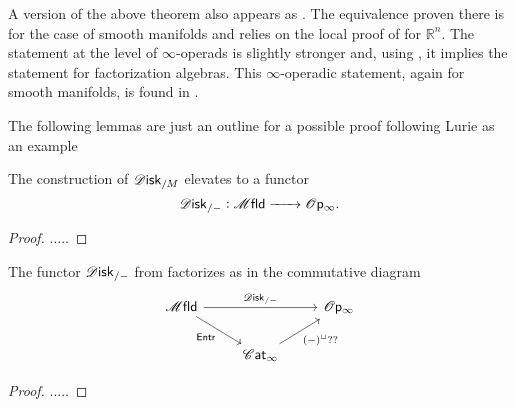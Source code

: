 \documentclass[../text.tex]{subfiles}
\begin{document}
\begin{remark}
    A version of the above theorem also appears as \cite[prop.18]{ginot2015}. The equivalence proven there is for the case of smooth manifolds and relies on the local proof of \cite{lurie_ha} for $\mathbb{R}^n$. The statement at the level of $\infty$-operads is slightly stronger and, using , it implies the statement for factorization algebras. This $\infty$-operadic statement, again for smooth manifolds, is found in \cite[ex.5.4.5.5]{lurie_ha}.
\end{remark}

{\color{red} The following lemmas are just an outline for a possible proof following Lurie as an example}

\begin{lemma}\label{lem:slicing_disk_functor}
    The construction of $\disk_{/M}$ elevates to a functor
    \begin{equation}
        \disk_{/-}: \mfld \xrightarrow{\ \ \ \ \ } \mathscr{O}\mathsf{p}_{\infty}.
    \end{equation}
\end{lemma}

\begin{proof}
    .....
\end{proof}

\begin{lemma}
    The functor $\disk_{/-}$ from  factorizes as in the commutative diagram
    \begin{equation}
        \begin{tikzcd}
            \mfld \arrow[rr, "\disk_{/-}"] \arrow[dr, "\mathsf{Entr}"'] & & \mathscr{O} \mathsf{p}_{\infty} \\
            & \cat \arrow[ur, "(-)^\sqcup ??"'] &
        \end{tikzcd}
    \end{equation}
\end{lemma}

\begin{proof}
    .....
\end{proof}
\end{document}
